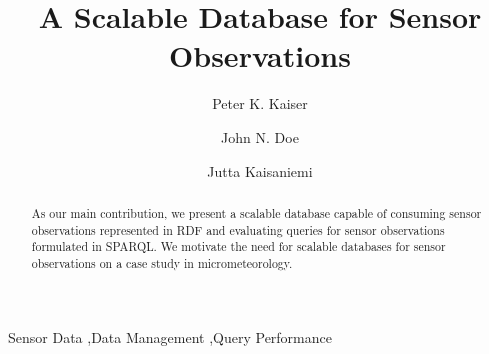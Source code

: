\documentclass[preprint,12pt,authoryear]{elsarticle}
\begin{document}
\begin{frontmatter}



\title{A Scalable Database for Sensor Observations}


\author[inst1]{Peter K. Kaiser}
\author[inst2]{John N. Doe}
\author[inst3]{Jutta Kaisaniemi}
\address[inst1]{Environmental Informatics Research Group, University of Zurich}
\address[inst2]{Biogeochemistry Research Group, Australian National University}
\address[inst3]{College of Engineering and Computer Science, University of Eastern Finland}

\begin{abstract}
As our main contribution, we present a scalable database capable of consuming sensor observations represented in RDF and evaluating queries for sensor observations formulated in SPARQL. We motivate the need for scalable databases for sensor observations on a case study in micrometeorology.
\end{abstract}

\begin{keyword}
Sensor Data \sep Data Management \sep Query Performance



\end{keyword}

\end{frontmatter}
\end{document}

